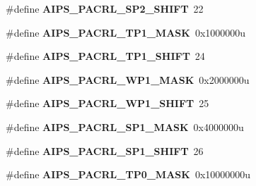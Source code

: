 \begin{DoxyCompactItemize}
\item 
\#define {\bfseries A\+I\+P\+S\+\_\+\+P\+A\+C\+R\+L\+\_\+\+S\+P2\+\_\+\+S\+H\+I\+FT}~22\hypertarget{group__AIPS__Register__Masks_gabe98bf55d378e6b71692ea6b6b890865}{}\label{group__AIPS__Register__Masks_gabe98bf55d378e6b71692ea6b6b890865}

\item 
\#define {\bfseries A\+I\+P\+S\+\_\+\+P\+A\+C\+R\+L\+\_\+\+T\+P1\+\_\+\+M\+A\+SK}~0x1000000u\hypertarget{group__AIPS__Register__Masks_ga803c07007800a44bc6af77934bb17be7}{}\label{group__AIPS__Register__Masks_ga803c07007800a44bc6af77934bb17be7}

\item 
\#define {\bfseries A\+I\+P\+S\+\_\+\+P\+A\+C\+R\+L\+\_\+\+T\+P1\+\_\+\+S\+H\+I\+FT}~24\hypertarget{group__AIPS__Register__Masks_gafff2f69445a04798fc4c11e9e5e4f160}{}\label{group__AIPS__Register__Masks_gafff2f69445a04798fc4c11e9e5e4f160}

\item 
\#define {\bfseries A\+I\+P\+S\+\_\+\+P\+A\+C\+R\+L\+\_\+\+W\+P1\+\_\+\+M\+A\+SK}~0x2000000u\hypertarget{group__AIPS__Register__Masks_ga906d8fa56769e12d438090dca4ebcb69}{}\label{group__AIPS__Register__Masks_ga906d8fa56769e12d438090dca4ebcb69}

\item 
\#define {\bfseries A\+I\+P\+S\+\_\+\+P\+A\+C\+R\+L\+\_\+\+W\+P1\+\_\+\+S\+H\+I\+FT}~25\hypertarget{group__AIPS__Register__Masks_ga73ade8625dbe5121d5e871b91c394abd}{}\label{group__AIPS__Register__Masks_ga73ade8625dbe5121d5e871b91c394abd}

\item 
\#define {\bfseries A\+I\+P\+S\+\_\+\+P\+A\+C\+R\+L\+\_\+\+S\+P1\+\_\+\+M\+A\+SK}~0x4000000u\hypertarget{group__AIPS__Register__Masks_gaec0ae8a4db0b0a8f69e5c6b85b85fcb5}{}\label{group__AIPS__Register__Masks_gaec0ae8a4db0b0a8f69e5c6b85b85fcb5}

\item 
\#define {\bfseries A\+I\+P\+S\+\_\+\+P\+A\+C\+R\+L\+\_\+\+S\+P1\+\_\+\+S\+H\+I\+FT}~26\hypertarget{group__AIPS__Register__Masks_ga2da94a2960a1befd9a63381d016eb0fa}{}\label{group__AIPS__Register__Masks_ga2da94a2960a1befd9a63381d016eb0fa}

\item 
\#define {\bfseries A\+I\+P\+S\+\_\+\+P\+A\+C\+R\+L\+\_\+\+T\+P0\+\_\+\+M\+A\+SK}~0x10000000u\hypertarget{group__AIPS__Register__Masks_gaefd0ffd9d4a2ba5b9700ff85ba7e6c9b}{}\label{group__AIPS__Register__Masks_gaefd0ffd9d4a2ba5b9700ff85ba7e6c9b}


\end{DoxyCompactItemize}
